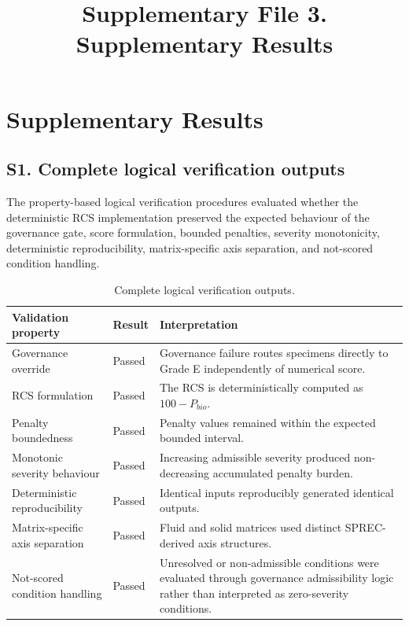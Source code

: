 \documentclass[preprint,12pt]{elsarticle}
\begin{document}
\begin{frontmatter}
\title{Supplementary File 3. Supplementary Results}
\end{frontmatter}

\section*{Supplementary Results}

\subsection*{S1. Complete logical verification outputs}

The property-based logical verification procedures evaluated whether the deterministic RCS implementation preserved the expected behaviour of the governance gate, score formulation, bounded penalties, severity monotonicity, deterministic reproducibility, matrix-specific axis separation, and not-scored condition handling.

\begin{table}[!htbp]
\caption{Complete logical verification outputs.}
\label{tab:logical_verification_outputs}
\centering
\footnotesize
\setlength{\tabcolsep}{4pt}
\renewcommand{\arraystretch}{1.10}

\begin{tabular}{@{}L{3.8cm}C{1.8cm}L{8.2cm}@{}}
\toprule
\textbf{Validation property}
& \textbf{Result}
& \textbf{Interpretation} \\
\midrule

Governance override
& Passed
& Governance failure routes specimens directly to Grade E independently of numerical score. \\

RCS formulation
& Passed
& The RCS is deterministically computed as \(100-P_{bio}\). \\

Penalty boundedness
& Passed
& Penalty values remained within the expected bounded interval. \\

Monotonic severity behaviour
& Passed
& Increasing admissible severity produced non-decreasing accumulated penalty burden. \\

Deterministic reproducibility
& Passed
& Identical inputs reproducibly generated identical outputs. \\

Matrix-specific axis separation
& Passed
& Fluid and solid matrices used distinct SPREC-derived axis structures. \\

Not-scored condition handling
& Passed
& Unresolved or non-admissible conditions were evaluated through governance admissibility logic rather than interpreted as zero-severity conditions. \\

\bottomrule
\end{tabular}
\end{table}
\end{document}
